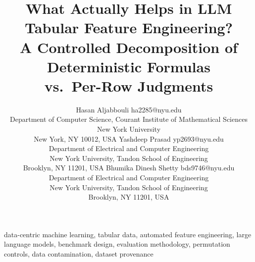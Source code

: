 \documentclass[twoside,11pt]{article}
\begin{document}
\title{What Actually Helps in LLM Tabular Feature Engineering?\\
A Controlled Decomposition of Deterministic Formulas\\ vs.\ Per-Row Judgments}

\author{\name Hasan Aljabbouli \email ha2285@nyu.edu \\
       \addr Department of Computer Science, Courant Institute of Mathematical Sciences\\
       New York University\\
       New York, NY 10012, USA
       \AND
       \name Yashdeep Prasad \email yp2693@nyu.edu \\
       \addr Department of Electrical and Computer Engineering\\
       New York University, Tandon School of Engineering\\
       Brooklyn, NY 11201, USA
       \AND
       \name Bhumika Dinesh Shetty \email bds9746@nyu.edu \\
       \addr Department of Electrical and Computer Engineering\\
       New York University, Tandon School of Engineering\\
       Brooklyn, NY 11201, USA}


\maketitle

\begin{abstract}%

\end{abstract}

\begin{keywords}
  data-centric machine learning, tabular data, automated feature engineering, large language models, benchmark design, evaluation methodology, permutation controls, data contamination, dataset provenance
\end{keywords}



\impact{}


\vskip 0.2in


\appendix

\end{document}
